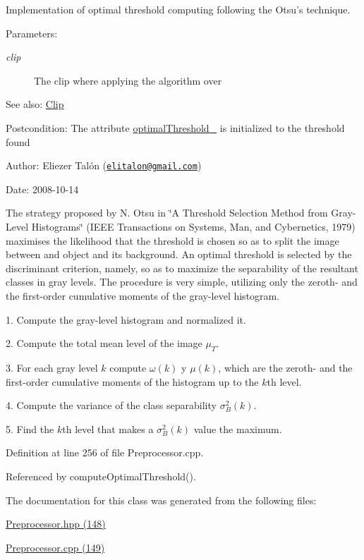 Implementation of optimal threshold computing following the Otsu's technique. 

\begin{Desc}
\item[Parameters:]
\begin{description}
\item[{\em clip}]The clip where applying the algorithm over\end{description}
\end{Desc}
\begin{Desc}
\item[See also:]\hyperlink{class_clip}{Clip}\end{Desc}
\begin{Desc}
\item[Postcondition:]The attribute \hyperlink{class_preprocessor_865b1e28dd9535b96f70727a550104fe}{optimalThreshold\_\-} is initialized to the threshold found\end{Desc}
\begin{Desc}
\item[Author:]Eliezer Talón (\href{mailto:elitalon@gmail.com}{\tt elitalon@gmail.com}) \end{Desc}
\begin{Desc}
\item[Date:]2008-10-14\end{Desc}
The strategy proposed by N. Otsu in \char`\"{}A Threshold Selection Method from Gray-Level Histograms\char`\"{} (IEEE Transactions on Systems, Man, and Cybernetics, 1979) maximises the likelihood that the threshold is chosen so as to split the image between and object and its background. An optimal threshold is selected by the discriminant criterion, namely, so as to maximize the separability of the resultant classes in gray levels. The procedure is very simple, utilizing only the zeroth- and the first-order cumulative moments of the gray-level histogram. 

1. Compute the gray-level histogram and normalized it.

2. Compute the total mean level of the image $\mu_T$.

3. For each gray level $k$ compute $\omega(k)$ y $\mu(k)$, which are the zeroth- and the first-order cumulative moments of the histogram up to the $k$th level.

4. Compute the variance of the class separability $\sigma_B^2(k)$.

5. Find the $k$th level that makes a $\sigma_B^2(k)$ value the maximum. 

Definition at line 256 of file Preprocessor.cpp.

Referenced by computeOptimalThreshold().

The documentation for this class was generated from the following files:\begin{CompactItemize}
\item 
\hyperlink{_preprocessor_8hpp}{Preprocessor.hpp (148)}\item 
\hyperlink{_preprocessor_8cpp}{Preprocessor.cpp (149)}\end{CompactItemize}
